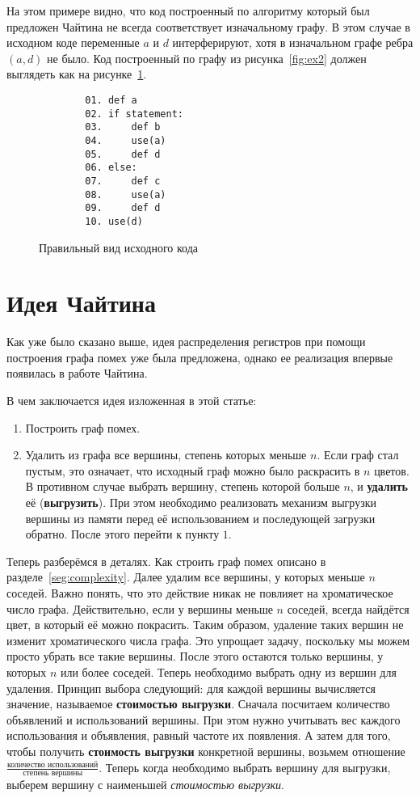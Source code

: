 \documentclass[12pt]{article}
\begin{document}
На этом примере видно, что код построенный по алгоритму который был предложен Чайтина не
всегда соответствует изначальному графу. В этом случае в исходном коде переменные
$a$ и $d$ интерферируют, хотя в изначальном графе ребра $(a, d)$ не было. Код построенный
по графу из рисунка~\ref{fig:ex2} должен выглядеть как на рисунке~\ref{fig:right_ex2}.

\begin{figure}[H]
    \centering
    \lstset{basicstyle=\ttfamily\small, frame=single}
    \begin{lstlisting}
        01. def a
        02. if statement:
        03.     def b
        04.     use(a)
        05.     def d 
        06. else:
        07.     def c
        08.     use(a)
        09.     def d
        10. use(d)
    \end{lstlisting}
    \caption{Правильный вид исходного кода}
    \label{fig:right_ex2}
\end{figure}

\section{Идея Чайтина}
Как уже было сказано выше, идея распределения регистров при помощи построения графа помех уже была
предложена, однако ее реализация впервые появилась в работе Чайтина.

В чем заключается идея изложенная в этой статье:
\begin{enumerate}
    \item Построить граф помех.
    \item Удалить из графа все вершины, степень которых меньше $n$. Если граф стал пустым, это означает, что исходный
    граф можно было раскрасить в $n$ цветов. В противном случае выбрать вершину, степень которой больше $n$, и \textbf{удалить}
    её (\textbf{выгрузить}). При этом необходимо реализовать механизм выгрузки вершины из памяти перед её использованием и
    последующей загрузки обратно. После этого перейти к пункту $1$.
\end{enumerate}

Теперь разберёмся в деталях. Как строить граф помех описано в разделе~\ref{seg:complexity}. Далее удалим все вершины, у
которых меньше $n$ соседей. Важно понять, что это действие никак не повлияет на хроматическое число графа. Действительно,
если у вершины меньше $n$ соседей, всегда найдётся цвет, в который её можно покрасить. Таким образом, удаление таких вершин
не изменит хроматического числа графа. Это упрощает задачу, поскольку мы можем просто убрать все такие вершины. После этого
остаются только вершины, у которых $n$ или более соседей. Теперь необходимо выбрать одну из вершин для удаления. Принцип выбора
следующий: для каждой вершины вычисляется значение, называемое \textbf{стоимостью выгрузки}. Сначала посчитаем количество
объявлений и использований вершины. При этом нужно учитывать вес каждого использования и объявления, равный частоте их появления.
А затем для того, чтобы получить \textbf{стоимость выгрузки} конкретной вершины, возьмем отношение
$\frac{\textit{количество использований}}{\textit{степень вершины}}$. Теперь когда необходимо выбрать вершину для выгрузки,
выберем вершину с наименьшей \textit{стоимостью выгрузки}.
\end{document}
